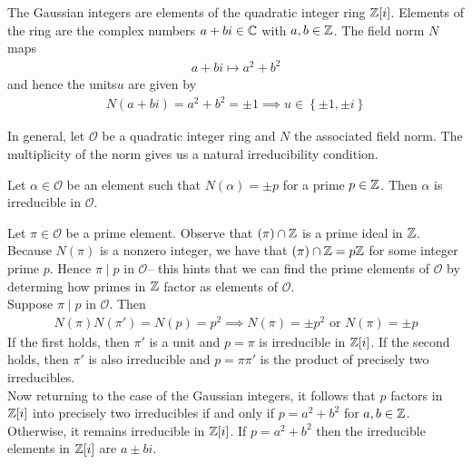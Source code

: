 \documentclass{memoir}
\begin{document}


\begin{defn}
	The Gaussian integers are elements of the quadratic integer ring \(\mathbb{Z}[i]\). Elements of the ring are the complex numbers \(a+bi \in \mathbb{C}\) with \(a,b \in \mathbb{Z}\). The field norm \(N\) maps
	\begin{align*}
		a+bi \mapsto a^2+b^2
	\end{align*}
	and hence the units\(u\) are given by
	\begin{align*}
		N(a+bi) = a^2+b^2 = \pm 1 \implies u \in \left\{ \pm 1, \pm i \right\}
	\end{align*}
\end{defn}

In general, let \(\mathcal{O}\) be a quadratic integer ring and \(N\) the associated field norm. The multiplicity of the norm gives us a natural irreducibility condition.

\begin{hw}
	Let \(\alpha  \in \mathcal{O}\) be an element such that \(N(\alpha ) = \pm p\) for a prime \(p \in \mathbb{Z}\). Then \(\alpha \) is irreducible in \(\mathcal{O}\).
\end{hw}

Let \(\pi \in \mathcal{O}\) be a prime element. Observe that \((\pi ) \cap \mathbb{Z}\) is a prime ideal in \(\mathbb{Z}\). Because \(N(\pi )\) is a nonzero integer, we have that \((\pi )\cap \mathbb{Z} = p\mathbb{Z}\) for some integer prime \(p\). Hence \(\pi \mid p\) in \(\mathcal{O}\)-- this hints that we can find the prime elements of \(\mathcal{O}\) by determing how primes in \(\mathbb{Z}\) factor as elements of \(\mathcal{O}\).\\

Suppose \(\pi \mid p\) in \(\mathcal{O}\). Then
\begin{align*}
	N(\pi )N(\pi ') = N(p) = p^2 \implies N(\pi ) = \pm p^2 \text{ or } N(\pi ) = \pm p
\end{align*}
If the first holds, then \(\pi '\) is a unit and \(p = \pi \) is irreducible in \(\mathbb{Z}[i]\). If the second holds, then \(\pi '\) is also irreducible and \(p = \pi \pi '\) is the product of precisely two irreducibles.\\

Now returning to the case of the Gaussian integers, it follows that \(p\) factors in \(\mathbb{Z}[i]\) into precisely two irreducibles if and only if \(p = a^2+b^2\) for \(a,b \in \mathbb{Z}\). Otherwise, it remains irreducible in \(\mathbb{Z}[i]\). If \(p=a^2+b^2\) then the irreducible elements in \(\mathbb{Z}[i]\) are \(a\pm bi\).
\end{document}
